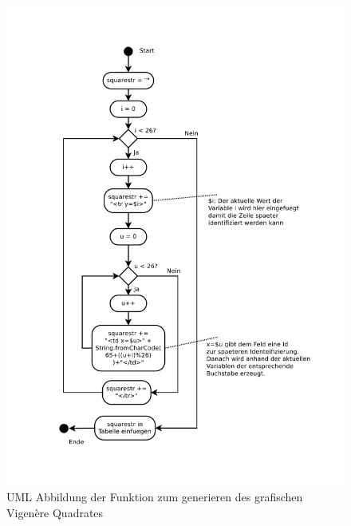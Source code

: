 \documentclass[11pt,paper=a4,final]{scrartcl}
\begin{document}
\begin{figure}[h!]
  \centering
  \includegraphics[width=\textwidth]{gensquare.pdf}
  \caption{UML Abbildung der Funktion zum generieren des grafischen Vigen\`ere
  Quadrates}
  \label{fig:gensquare}
\end{figure}
\end{document}
